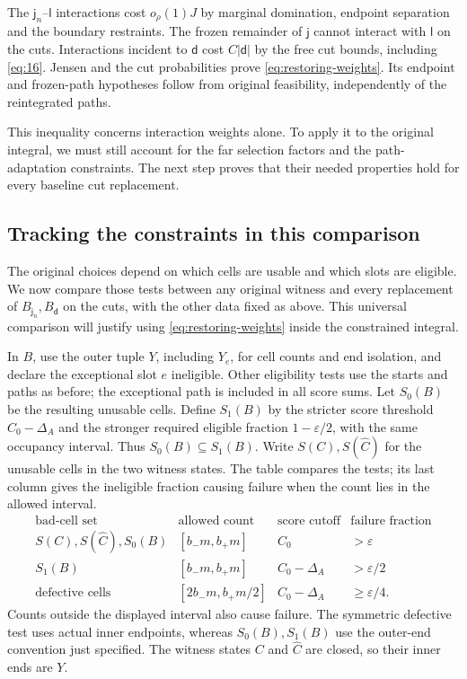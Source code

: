 The $\mathsf j_n$--$\mathsf l$ interactions cost $o_\rho(1)J$ by
marginal domination, endpoint separation and the boundary restraints.
The frozen remainder of $\mathsf j$ cannot interact with $\mathsf l$
on the cuts. Interactions incident to $\mathsf d$ cost
$C|\mathsf d|$ by the free cut bounds, including \eqref{eq:16}.
Jensen and the cut probabilities prove \eqref{eq:restoring-weights}.
Its endpoint and frozen-path hypotheses follow from original feasibility,
independently of the reintegrated paths.

This inequality concerns interaction weights alone. To apply it to the
original integral, we must still account for the far selection factors
and the path-adaptation constraints. The next step proves that their
needed properties hold for every baseline cut replacement.

\subsection{Tracking the constraints in this comparison}

The original choices depend on which cells are usable and which slots
are eligible. We now compare those tests between any original witness
and every replacement of $B_{\mathsf j_n},B_{\mathsf d}$ on the cuts,
with the other data fixed as above. This universal comparison will
justify using \eqref{eq:restoring-weights} inside the constrained integral.

In $B$, use the outer tuple $Y$, including $Y_e$, for cell counts
and end isolation, and declare the exceptional slot $e$ ineligible.
Other eligibility tests use the starts and paths as before; the
exceptional path is included in all score sums. Let $S_0(B)$ be the
resulting unusable cells. Define $S_1(B)$ by the stricter score threshold
$C_0-\Delta_A$ and the stronger required eligible fraction
$1-\varepsilon/2$, with the same occupancy interval. Thus
$S_0(B)\subseteq S_1(B)$. Write $S(C),S(\widehat C)$ for the
unusable cells in the two witness states. The table compares the tests;
its last column gives the ineligible fraction causing failure when the
count lies in the allowed interval.
\[
\begin{array}{c|c|c|c}
 \text{bad-cell set}&\text{allowed count}&\text{score cutoff}
                                      &\text{failure fraction}\\ \hline
 S(C),S(\widehat C),S_0(B)&[b_-m,b_+m]&C_0&>\varepsilon\\
 S_1(B)&[b_-m,b_+m]&C_0-\Delta_A&>\varepsilon/2\\
 \text{defective cells}
    &[2b_-m,b_+m/2]&C_0-\Delta_A&\ge\varepsilon/4.
\end{array}
\]
Counts outside the displayed interval also cause failure. The symmetric
defective test uses actual inner endpoints, whereas $S_0(B),S_1(B)$
use the outer-end convention just specified. The witness states $C$
and $\widehat C$ are closed, so their inner ends are $Y$.

